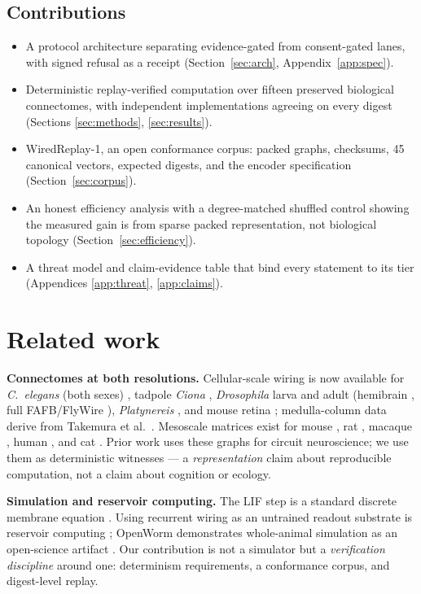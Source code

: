 \documentclass[pdflatex,sn-basic]{sn-jnl}
\begin{document}
\subsection{Contributions}
\begin{itemize}
\item A protocol architecture separating evidence-gated from
      consent-gated lanes, with signed refusal as a receipt
      (Section~\ref{sec:arch}, Appendix~\ref{app:spec}).
\item Deterministic replay-verified computation over fifteen
      preserved biological connectomes, with independent
      implementations agreeing on every digest (Sections
      \ref{sec:methods}, \ref{sec:results}).
\item WiredReplay-1, an open conformance corpus: packed graphs,
      checksums, 45 canonical vectors, expected digests, and the
      encoder specification (Section~\ref{sec:corpus}).
\item An honest efficiency analysis with a degree-matched shuffled
      control showing the measured gain is from sparse packed
      representation, not biological topology
      (Section~\ref{sec:efficiency}).
\item A threat model and claim-evidence table that bind every
      statement to its tier (Appendices \ref{app:threat},
      \ref{app:claims}).
\end{itemize}

\section{Related work}\label{sec:related}
\textbf{Connectomes at both resolutions.} Cellular-scale wiring is now
available for \emph{C.\ elegans} (both sexes)
\cite{white1986,cook2019}, tadpole \emph{Ciona} \cite{ryan2016},
\emph{Drosophila} larva \cite{ohyama2015,gerhard2017} and adult
(hemibrain \cite{scheffer2020}, full FAFB/FlyWire
\cite{zheng2018,dorkenwald2024}), \emph{Platynereis}
\cite{veraszto2020}, and mouse retina \cite{helmstaedter2013};
medulla-column data derive from Takemura et al.\
\cite{takemura2015}. Mesoscale matrices exist for mouse
\cite{oh2014}, rat \cite{bota2015}, macaque
\cite{markov2014,modha2010}, human \cite{hagmann2008}, and cat
\cite{scannell1993}. Prior work uses these graphs for circuit
neuroscience; we use them as deterministic witnesses --- a
\emph{representation} claim about reproducible computation, not a
claim about cognition or ecology.

\textbf{Simulation and reservoir computing.} The LIF step is a
standard discrete membrane equation \cite{hh1952,brette2007,izhikevich2003}.
Using recurrent wiring as an untrained readout substrate is reservoir
computing \cite{jaeger2001,maass2002,lukosevicius2009}; OpenWorm
demonstrates whole-animal simulation as an open-science artifact
\cite{szigeti2014}. Our contribution is not a simulator but a
\emph{verification discipline} around one: determinism requirements,
a conformance corpus, and digest-level replay.
\end{document}
